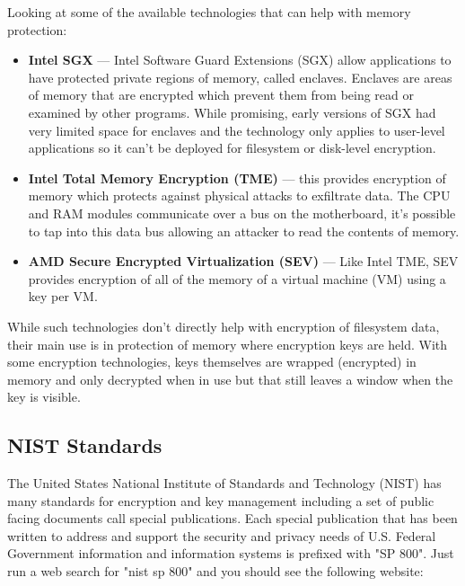 Looking at some of the available technologies that can help with memory protection:

\begin{itemize}
	\item \textbf{Intel SGX} --- Intel Software Guard Extensions (SGX) allow applications to have protected private regions of 
		memory, called enclaves. Enclaves are areas of memory that are encrypted which prevent them from being
		read or examined by other programs. While promising, early versions of SGX had very limited space for enclaves
		and the technology only applies to user-level applications so it can't be deployed for filesystem or disk-level
		encryption.
	\item \textbf{Intel Total Memory Encryption (TME)} --- this provides encryption of memory which protects against physical 
		attacks to exfiltrate data. The CPU and RAM modules communicate over a bus on the motherboard, it's possible to 
		tap into this data bus allowing an attacker to read the contents of memory.
	\item \textbf{AMD Secure Encrypted Virtualization (SEV)} --- Like Intel TME, SEV provides encryption of all of the 
		memory of a virtual machine (VM) using a key per VM.
\end{itemize}

\noindent
While such technologies don't directly help with encryption of filesystem data, their main use is in protection of memory
where encryption keys are held. With some encryption technologies, keys themselves are wrapped (encrypted) in memory and only decrypted when in use but that still leaves a window when the key is visible.

\subsection{NIST Standards}

The United States National Institute of Standards and Technology (NIST) has many standards for encryption and key management including a set of public facing documents call special publications. Each special publication that has been written to address and support the security and privacy needs of U.S. Federal Government information and information systems is prefixed with "SP 800". Just run a web search for "nist sp 800" and you should see the following website:

